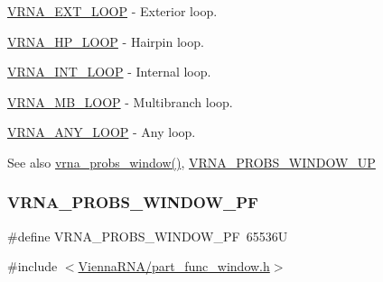 \begin{DoxyItemize}
\item \mbox{\hyperlink{group__part__func__window_gaf0bb577130090f6c856d1358804250bf}{V\+R\+N\+A\+\_\+\+E\+X\+T\+\_\+\+L\+O\+OP}} -\/ Exterior loop.
\item \mbox{\hyperlink{group__part__func__window_ga30170811c320f3a7b23ffff3b3343b91}{V\+R\+N\+A\+\_\+\+H\+P\+\_\+\+L\+O\+OP}} -\/ Hairpin loop.
\item \mbox{\hyperlink{group__part__func__window_ga956a237e7d956b684b7d593cb3eca665}{V\+R\+N\+A\+\_\+\+I\+N\+T\+\_\+\+L\+O\+OP}} -\/ Internal loop.
\item \mbox{\hyperlink{group__part__func__window_gad905b71f02b3799eb84b490435aec837}{V\+R\+N\+A\+\_\+\+M\+B\+\_\+\+L\+O\+OP}} -\/ Multibranch loop.
\item \mbox{\hyperlink{group__part__func__window_ga1fef1ad234755db78ab6b695edce5080}{V\+R\+N\+A\+\_\+\+A\+N\+Y\+\_\+\+L\+O\+OP}} -\/ Any loop.
\end{DoxyItemize}

\begin{DoxySeeAlso}{See also}
\mbox{\hyperlink{group__part__func__window_ga7115d012988541a65ec323c5f17a334b}{vrna\+\_\+probs\+\_\+window()}}, \mbox{\hyperlink{group__part__func__window_ga18325811c7dfc7b7d9d4ac37f4353615}{V\+R\+N\+A\+\_\+\+P\+R\+O\+B\+S\+\_\+\+W\+I\+N\+D\+O\+W\+\_\+\+UP}} 
\end{DoxySeeAlso}
\mbox{\label{group__part__func__window_ga4b79137d9b28b1f9cac7983792ce34a0}} 
\subsubsection{\texorpdfstring{VRNA\_PROBS\_WINDOW\_PF}{VRNA\_PROBS\_WINDOW\_PF}}
{\footnotesize\ttfamily \#define V\+R\+N\+A\+\_\+\+P\+R\+O\+B\+S\+\_\+\+W\+I\+N\+D\+O\+W\+\_\+\+PF~65536U}



{\ttfamily \#include $<$\mbox{\hyperlink{part__func__window_8h}{Vienna\+R\+N\+A/part\+\_\+func\+\_\+window.\+h}}$>$}



